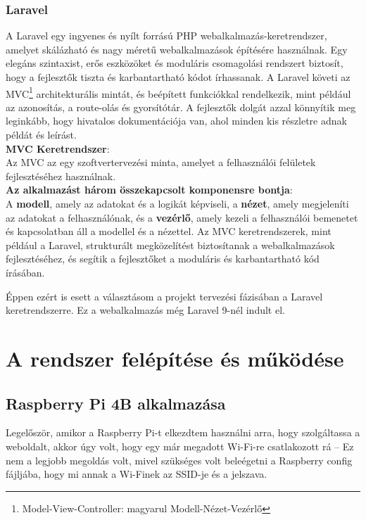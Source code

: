 \documentclass[
]{thesis-ekf}
\theoremstyle{definition}
\theoremstyle{remark}
\begin{document}
	\subsection{Laravel}
	A Laravel egy ingyenes és nyílt forrású PHP webalkalmazás-keretrendszer, amelyet skálázható és nagy méretű webalkalmazások építésére használnak. Egy elegáns szintaxist, erős eszközöket és moduláris csomagolási rendszert biztosít, hogy a fejlesztők tiszta és karbantartható kódot írhassanak. A Laravel követi az MVC\footnote{Model-View-Controller: magyarul Modell-Nézet-Vezérlő} architekturális mintát, és beépített funkciókkal rendelkezik, mint például az azonosítás, a route-olás és gyorsítótár.\cite{laravel-intro}
	A fejlesztők dolgát azzal könnyítik meg leginkább, hogy hivatalos dokumentációja van, ahol minden kis részletre adnak példát és leírást.\cite{laravel-docs}\\
	\textbf{MVC Keretrendszer}:\\
	Az MVC az egy szoftvertervezési minta, amelyet a felhasználói felületek fejlesztéséhez használnak. \\
	\textbf{Az alkalmazást három összekapcsolt komponensre bontja}:\\A \textbf{modell}, amely az adatokat és a logikát képviseli, a \textbf{nézet}, amely megjeleníti az adatokat a felhasználónak, és a \textbf{vezérlő}, amely kezeli a felhasználói bemenetet és kapcsolatban áll a modellel és a nézettel. Az MVC keretrendszerek, mint például a Laravel, strukturált megközelítést biztosítanak a webalkalmazások fejlesztéséhez, és segítik a fejlesztőket a moduláris és karbantartható kód írásában.
	
	Éppen ezért is esett a választásom a projekt tervezési fázisában a Laravel keretrendszerre. Ez a webalkalmazás még Laravel 9-nél indult el.
	
	\chapter{A rendszer felépítése és működése}
	\section{Raspberry Pi 4B alkalmazása}
	
	Legelőször, amikor a Raspberry Pi-t elkezdtem használni arra, hogy szolgáltassa a weboldalt, akkor úgy volt, hogy egy már megadott Wi-Fi-re csatlakozott rá -- Ez nem a legjobb megoldás volt, mivel szükséges volt beleégetni a Raspberry config fájljába, hogy mi annak a Wi-Finek az SSID-je és a jelszava.
	
\end{document}
